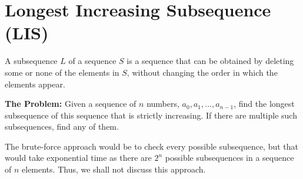 \documentclass[12pt, a4paper]{article}
\theoremstyle{definition}
\theoremstyle{remark}
\begin{document}
\section{Longest Increasing Subsequence (LIS)}
A subsequence $L$ of a sequence $S$ is a sequence that can be obtained by deleting some or none of the elements in $S$, without changing the order in which the elements appear.
\begin{tcolorbox}
    \textbf{The Problem:} Given a sequence of $n$ numbers, $a_0, a_1,\ldots,a_{n-1}$, find the longest subsequence of this sequence that is strictly increasing. If there are multiple such subsequences, find any of them.
\end{tcolorbox}
The brute-force approach would be to check every possible subsequence, but that would take exponential time as there are $2^n$ possible subsequences in a sequence of $n$ elements. Thus, we shall not discuss this approach.
\end{document}
